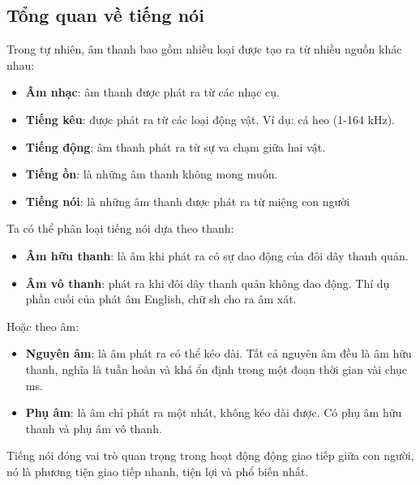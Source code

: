 \subsection{Tổng quan về tiếng nói}
Trong tự nhiên, âm thanh bao gồm nhiều loại được tạo ra từ nhiều nguồn khác nhau: 
\begin{itemize}
	\item \textbf{Âm nhạc}: âm thanh được phát ra từ các nhạc cụ.
	\item \textbf{Tiếng kêu}: được phát ra từ các loại động vật. Ví dụ: cá heo (1-164 kHz).
	\item \textbf{Tiếng động}: âm thanh phát ra từ sự va chạm giữa hai vật.
	\item \textbf{Tiếng ồn}: là những âm thanh không mong muốn.
	\item \textbf{Tiếng nói}: là những âm thanh được phát ra từ miệng con người
\end{itemize}

\noindent Ta có thể phân loại tiếng nói dựa theo thanh:
\begin{itemize}
	\item \textbf{Âm hữu thanh}: là âm khi phát ra có sự dao động của đôi dây thanh quản.
	\item \textbf{Âm vô thanh}: phát ra khi đôi dây thanh quản không dao động. Thí dụ phần cuối của phát âm English, chữ sh cho ra âm xát.
\end{itemize}

\noindent Hoặc theo âm:
\begin{itemize}
	\item \textbf{Nguyên âm}: là âm phát ra có thể kéo dài. Tất cả nguyên âm đều là âm hữu thanh, nghĩa là tuần hoàn và khá ổn định trong một đoạn thời gian vài chục ms.
	\item \textbf{Phụ âm}: là âm chỉ phát ra một nhát, không kéo dài được. Có phụ âm hữu thanh và phụ âm vô thanh.
\end{itemize}

Tiếng nói đóng vai trò quan trọng trong hoạt động động giao tiếp giữa con người, nó là phương tiện giao tiếp nhanh, tiện lợi và phổ biến nhất.

